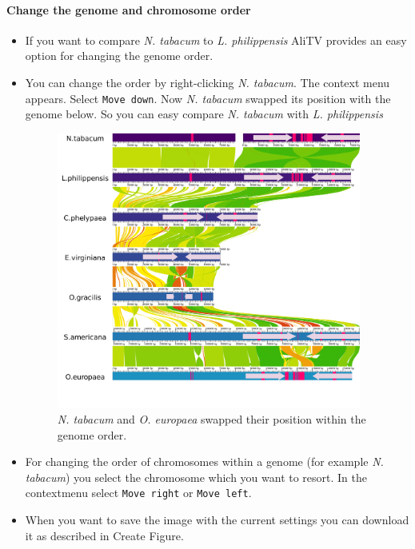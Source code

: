 \documentclass[a4paper]{scrartcl}
\begin{document}
\paragraph*{Change the genome and chromosome order}	
\begin{itemize}
\item If you want to compare \emph{N. tabacum} to \emph{L. philippensis} AliTV provides an easy option  for changing the genome order.
\item You can change the order by right-clicking \emph{N. tabacum}. The context menu appears. Select \texttt{Move down}. Now \emph{N. tabacum} swapped its position with the genome below. So you can easy compare \emph{N. tabacum} with \emph{L. philippensis}

	\begin{figure}[H]
		\centering
		\includegraphics[width=10cm]{swap1.png}
		\caption{\emph{N. tabacum} and \emph{O. europaea} swapped their position within the genome order.}
	\end{figure}
	\item For changing the order of chromosomes within a genome (for example \emph{N. tabacum}) you select the chromosome which you want to resort. In the contextmenu select \texttt{Move right} or \texttt{Move left}.
	\item When you want to save the image with the current settings you can download it as described in Create Figure.
\end{itemize}
\end{document}
